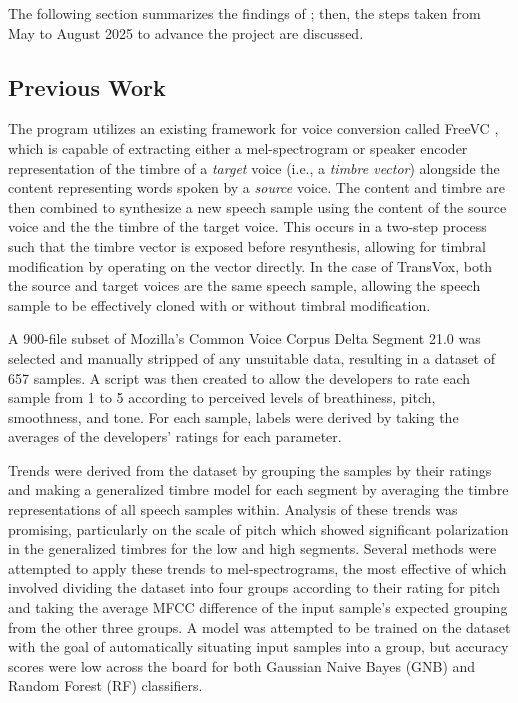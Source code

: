 \documentclass{article}
\begin{document}
The following section summarizes the findings of \cite{doyle2025}; then, the steps taken from May to August 2025 to advance the project are discussed.

\subsection{Previous Work}

The program utilizes an existing framework for voice conversion called FreeVC \cite{li2022}, which is capable of extracting either a mel-spectrogram or speaker encoder representation of the timbre of a \textit{target} voice (i.e., a \textit{timbre vector}) alongside the content representing words spoken by a \textit{source} voice. The content and timbre are then combined to synthesize a new speech sample using the content of the source voice and the the timbre of the target voice. This occurs in a two-step process such that the timbre vector is exposed before resynthesis, allowing for timbral modification by operating on the vector directly. In the case of TransVox, both the source and target voices are the same speech sample, allowing the speech sample to be effectively cloned with or without timbral modification.

A 900-file subset of Mozilla's Common Voice Corpus Delta Segment 21.0 \cite{mozilla2025} was selected and manually stripped of any unsuitable data, resulting in a dataset of 657 samples. A script was then created to allow the developers to rate each sample from 1 to 5 according to perceived levels of breathiness, pitch, smoothness, and tone. For each sample, labels were derived by taking the averages of the developers' ratings for each parameter.

Trends were derived from the dataset by grouping the samples by their ratings and making a generalized timbre model for each segment by averaging the timbre representations of all speech samples within. Analysis of these trends was promising, particularly on the scale of pitch which showed significant polarization in the generalized timbres for the low and high segments. Several methods were attempted to apply these trends to mel-spectrograms, the most effective of which involved dividing the dataset into four groups according to their rating for pitch and taking the average MFCC difference of the input sample's expected grouping from the other three groups. A model was attempted to be trained on the dataset with the goal of automatically situating input samples into a group, but accuracy scores were low across the board for both Gaussian Naive Bayes (GNB) and Random Forest (RF) classifiers.
\end{document}
